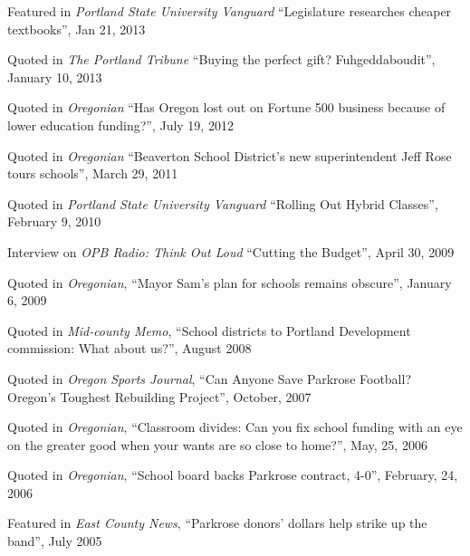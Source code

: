 \documentclass[Computer Science]{vita}
\begin{document}
\begin{vita}
\begin{Presentations and Invited Talks}
  \end{Presentations and Invited Talks}



  \begin{Media Outreach}
  
  \item Featured in \emph{Portland State University Vanguard} ``Legislature researches cheaper textbooks'', Jan 21, 2013
  
  \item Quoted in \emph{The Portland Tribune} ``Buying the perfect gift? Fuhgeddaboudit'', January 10, 2013
  
\item Quoted in \emph{Oregonian} ``Has Oregon lost out on Fortune 500 business because of lower education funding?'', July 19, 2012

\item Quoted in \emph{Oregonian} ``Beaverton School District's new superintendent Jeff Rose tours schools'', March 29, 2011
  
  \item Quoted in \emph{Portland State University Vanguard} ``Rolling Out Hybrid Classes'', February 9, 2010
  
  \item Interview on \emph{OPB Radio: Think Out Loud} ``Cutting the
    Budget'', April 30, 2009

  \item Quoted in \emph{Oregonian}, ``Mayor Sam's plan for schools
    remains obscure'', January 6, 2009

  \item Quoted in \emph{Mid-county Memo}, ``School districts to
    Portland Development commission: What about us?'', August 2008

  \item Quoted in \emph{Oregon Sports Journal}, ``Can Anyone Save
    Parkrose Football?  Oregon's Toughest Rebuilding Project'',
    October, 2007

  \item Quoted in \emph{Oregonian}, ``Classroom divides: Can you fix
    school funding with an eye on the greater good when your wants are
    so close to home?'', May, 25, 2006

  \item Quoted in \emph{Oregonian}, ``School board backs Parkrose
    contract, 4-0'', February, 24, 2006

  \item Featured in \emph{East County News}, ``Parkrose donors'
    dollars help strike up the band'', July 2005


\end{Media Outreach}
\end{vita}
\end{document}
